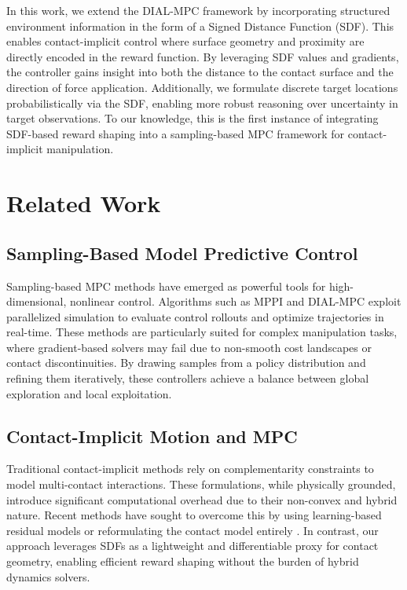 \documentclass[conference]{IEEEtran}
\begin{document}
In this work, we extend the DIAL-MPC framework by incorporating structured environment information in the form of a Signed Distance Function (SDF). This enables contact-implicit control where surface geometry and proximity are directly encoded in the reward function. By leveraging SDF values and gradients, the controller gains insight into both the distance to the contact surface and the direction of force application. Additionally, we formulate discrete target locations probabilistically via the SDF, enabling more robust reasoning over uncertainty in target observations. To our knowledge, this is the first instance of integrating SDF-based reward shaping into a sampling-based MPC framework for contact-implicit manipulation.

\section{Related Work}

\subsection{Sampling-Based Model Predictive Control}

Sampling-based MPC methods have emerged as powerful tools for high-dimensional, nonlinear control. Algorithms such as MPPI \cite{pezzato2025samplingbasedmodelpredictivecontrol} and DIAL-MPC \cite{xue2024fullordersamplingbasedmpctorquelevel} exploit parallelized simulation to evaluate control rollouts and optimize trajectories in real-time. These methods are particularly suited for complex manipulation tasks, where gradient-based solvers may fail due to non-smooth cost landscapes or contact discontinuities. By drawing samples from a policy distribution and refining them iteratively, these controllers achieve a balance between global exploration and local exploitation.

\subsection{Contact-Implicit Motion and MPC}

Traditional contact-implicit methods rely on complementarity constraints to model multi-contact interactions. These formulations, while physically grounded, introduce significant computational overhead due to their non-convex and hybrid nature. Recent methods have sought to overcome this by using learning-based residual models \cite{huang2024adaptivecontactimplicitmodelpredictive} or reformulating the contact model entirely \cite{jin2025complementarityfreemulticontactmodelingoptimization}. In contrast, our approach leverages SDFs as a lightweight and differentiable proxy for contact geometry, enabling efficient reward shaping without the burden of hybrid dynamics solvers.
\end{document}
